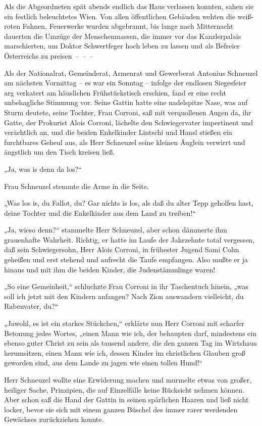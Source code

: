 Als die Abgeordneten spät abends endlich das Haus verlassen
konnten, sahen sie ein festlich beleuchtetes Wien. Von allen
öffentlichen Gebäuden wehten die weiß-roten Fahnen, Feuerwerke
wurden abgebrannt, bis lange nach  Mitternacht
dauerten die Umzüge der Menschenmassen, die immer vor das
Kanzlerpalais marschierten, um Doktor Schwertfeger hoch leben zu
lassen und als Befreier Österreichs zu preisen~–~–~–

\tb{* * *}
Als der Nationalrat, Gemeinderat, Armenrat und Gewerberat Antonius
Schneuzel am nächsten Vormittag – es war ein Sonntag – infolge der
endlosen Siegesfeier arg verkatert am häuslichen Frühstückstisch
erschien, fand er eine recht unbehagliche Stimmung vor. Seine
Gattin hatte eine nadelspitze Nase, was auf Sturm deutete, seine
Tochter, Frau Corroni, saß mit verquollenen Augen da, ihr Gatte,
der Prokurist Alois Corroni, lächelte den Schwiegervater
impertinent und verächtlich an, und die beiden Enkelkinder Lintschi
und Hansl stießen ein furchtbares Geheul aus, als Herr Schneuzel
seine kleinen Äuglein verwirrt und ängstlich um den Tisch kreisen
ließ.

„Ja, was is denn da los?“

Frau Schneuzel stemmte die Arme in die Seite.

„Was los is, du Fallot, du? Gar nichts is los, als daß du alter
Tepp geholfen hast, deine Tochter und die Enkelkinder aus dem Land
zu treiben!“

„Ja, wieso denn?“ stammelte Herr Schneuzel, aber schon dämmerte ihm
grauenhafte Wahrheit. Richtig, er hatte im Laufe der Jahrzehnte
total vergessen, daß sein Schwiegersohn, Herr Alois Corroni, in
frühester Jugend Sami Cohn geheißen und erst stehend und aufrecht
die  Taufe empfangen. Also mußte er ja hinaus und
mit ihm die beiden Kinder, die Judenstämmlinge waren!

„So eine Gemeinheit,“ schluchzte Frau Corroni in ihr Taschentuch
hinein, „was soll ich jetzt mit den Kindern anfangen? Nach Zion
auswandern vielleicht, du Rabenvater, du?“

„Jawohl, es ist ein starkes Stückchen,“ erklärte nun Herr Corroni
mit scharfer Betonung jedes Wortes, „einen Mann wie ich, der
behaupten darf, mindestens ein ebenso guter Christ zu sein als
tausend andere, die den ganzen Tag im Wirtshaus herumsitzen, einen
Mann wie ich, dessen Kinder im christlichen Glauben groß geworden
sind, aus dem Lande zu jagen wie einen tollen Hund!“

Herr Schneuzel wollte eine Erwiderung machen und murmelte etwas von
großer, heiliger Sache, Prinzipien, die auf Einzelfälle keine
Rücksicht nehmen können. Aber schon saß die Hand der Gattin in
seinen spärlichen Haaren und ließ nicht locker, bevor sie sich mit
einem ganzen Büschel des immer rarer werdenden Gewächses
zurückziehen konnte.

